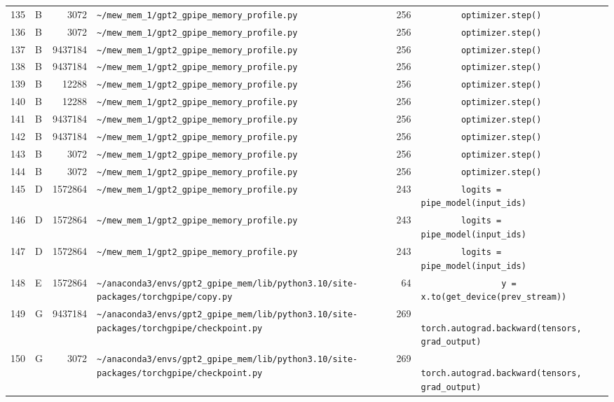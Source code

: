 \documentclass{article}
\begin{document}
\begin{longtable}{r l r p{6.5cm} r p{7.0cm}}
135 & B & 3072 & \lstinline|~/mew_mem_1/gpt2_gpipe_memory_profile.py| & 256 & \lstinline|        optimizer.step()| \\
136 & B & 3072 & \lstinline|~/mew_mem_1/gpt2_gpipe_memory_profile.py| & 256 & \lstinline|        optimizer.step()| \\
137 & B & 9437184 & \lstinline|~/mew_mem_1/gpt2_gpipe_memory_profile.py| & 256 & \lstinline|        optimizer.step()| \\
138 & B & 9437184 & \lstinline|~/mew_mem_1/gpt2_gpipe_memory_profile.py| & 256 & \lstinline|        optimizer.step()| \\
139 & B & 12288 & \lstinline|~/mew_mem_1/gpt2_gpipe_memory_profile.py| & 256 & \lstinline|        optimizer.step()| \\
140 & B & 12288 & \lstinline|~/mew_mem_1/gpt2_gpipe_memory_profile.py| & 256 & \lstinline|        optimizer.step()| \\
141 & B & 9437184 & \lstinline|~/mew_mem_1/gpt2_gpipe_memory_profile.py| & 256 & \lstinline|        optimizer.step()| \\
142 & B & 9437184 & \lstinline|~/mew_mem_1/gpt2_gpipe_memory_profile.py| & 256 & \lstinline|        optimizer.step()| \\
143 & B & 3072 & \lstinline|~/mew_mem_1/gpt2_gpipe_memory_profile.py| & 256 & \lstinline|        optimizer.step()| \\
144 & B & 3072 & \lstinline|~/mew_mem_1/gpt2_gpipe_memory_profile.py| & 256 & \lstinline|        optimizer.step()| \\
145 & D & 1572864 & \lstinline|~/mew_mem_1/gpt2_gpipe_memory_profile.py| & 243 & \lstinline|        logits = pipe_model(input_ids)| \\
146 & D & 1572864 & \lstinline|~/mew_mem_1/gpt2_gpipe_memory_profile.py| & 243 & \lstinline|        logits = pipe_model(input_ids)| \\
147 & D & 1572864 & \lstinline|~/mew_mem_1/gpt2_gpipe_memory_profile.py| & 243 & \lstinline|        logits = pipe_model(input_ids)| \\
148 & E & 1572864 & \lstinline|~/anaconda3/envs/gpt2_gpipe_mem/lib/python3.10/site-packages/torchgpipe/copy.py| & 64 & \lstinline|                y = x.to(get_device(prev_stream))| \\
149 & G & 9437184 & \lstinline|~/anaconda3/envs/gpt2_gpipe_mem/lib/python3.10/site-packages/torchgpipe/checkpoint.py| & 269 & \lstinline|            torch.autograd.backward(tensors, grad_output)| \\
150 & G & 3072 & \lstinline|~/anaconda3/envs/gpt2_gpipe_mem/lib/python3.10/site-packages/torchgpipe/checkpoint.py| & 269 & \lstinline|            torch.autograd.backward(tensors, grad_output)| \\

\end{longtable}
\end{document}

